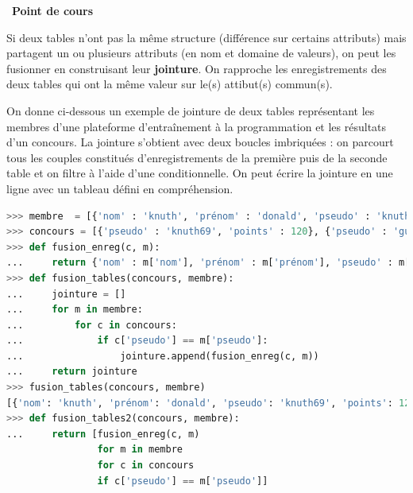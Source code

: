 \documentclass[
  11pt,
]{article}
\newcounter{def}
\newcounter{cours}
\newenvironment{cours}[1]
{\par \medskip   \addtocounter{cours}{1} \noindent  
\begin{bclogo}[arrondi =0.1,  ombre = true, barre=none, logo=\bcbook, marge=4]{~\textbf{Point de cours} \textbf{\thecours} {\itshape #1} }  \par}
{
\end{bclogo}
 \par \bigskip }
\newcounter{prog}
\begin{document}
\begin{cours}{}

Si deux tables n'ont pas la même structure (différence sur certains
attributs) mais partagent un ou plusieurs attributs (en nom et domaine
de valeurs), on peut les fusionner en construisant leur
\textbf{jointure}. On rapproche les enregistrements des deux tables qui
ont la même valeur sur le(s) attibut(s) commun(s).

On donne ci-dessous un exemple de jointure de deux tables représentant
les membres d'une plateforme d'entraînement à la programmation et les
résultats d'un concours. La jointure s'obtient avec deux boucles
imbriquées : on parcourt tous les couples constitués d'enregistrements
de la première puis de la seconde table et on filtre à l'aide d'une
conditionnelle. On peut écrire la jointure en une ligne avec un tableau
défini en compréhension.

\begin{lstlisting}[language=Python]
>>> membre  = [{'nom' : 'knuth', 'prénom' : 'donald', 'pseudo' : 'knuth69'}, {'nom' : 'van rossum', 'prénom' : 'guido', 'pseudo' : 'guido42'}]
>>> concours = [{'pseudo' : 'knuth69', 'points' : 120}, {'pseudo' : 'guido42', 'points' : 10}]
>>> def fusion_enreg(c, m):
...     return {'nom' : m['nom'], 'prénom' : m['prénom'], 'pseudo' : m['pseudo'], 'points' : c['points']}
>>> def fusion_tables(concours, membre):
...     jointure = []
...     for m in membre:
...         for c in concours:
...             if c['pseudo'] == m['pseudo']:
...                 jointure.append(fusion_enreg(c, m))
...     return jointure
>>> fusion_tables(concours, membre)
[{'nom': 'knuth', 'prénom': 'donald', 'pseudo': 'knuth69', 'points': 120}, {'nom': 'van rossum', 'prénom': 'guido', 'pseudo': 'guido42', 'points': 10}]
>>> def fusion_tables2(concours, membre):
...     return [fusion_enreg(c, m) 
                for m in membre 
                for c in concours 
                if c['pseudo'] == m['pseudo']]
\end{lstlisting}

\end{cours}
\end{document}
